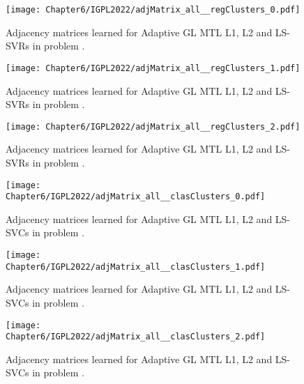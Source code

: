     



\begin{figure}[t!]
    \centering
    \texttt{[image: Chapter6/IGPL2022/adjMatrix\_all\_\_regClusters\_0.pdf]}
    \caption{Adjacency matrices learned for Adaptive GL MTL L1, L2 and LS-SVRs in problem .}
    \label{fig:reg_adjmatrix_regClusters0}
\end{figure}

\begin{figure}[t!]
    \centering
    \texttt{[image: Chapter6/IGPL2022/adjMatrix\_all\_\_regClusters\_1.pdf]}
    \caption{Adjacency matrices learned for Adaptive GL MTL L1, L2 and LS-SVRs in problem .}
    \label{fig:reg_adjmatrix_regClusters1}
\end{figure}

\begin{figure}[t!]
    \centering
    \texttt{[image: Chapter6/IGPL2022/adjMatrix\_all\_\_regClusters\_2.pdf]}
    \caption{Adjacency matrices learned for Adaptive GL MTL L1, L2 and LS-SVRs in problem .}
    \label{fig:reg_adjmatrix_regClusters2}
\end{figure}



\begin{figure}[t!]
    \centering
    \texttt{[image: Chapter6/IGPL2022/adjMatrix\_all\_\_clasClusters\_0.pdf]}
    \caption{Adjacency matrices learned for Adaptive GL MTL L1, L2 and LS-SVCs in problem .}
    \label{fig:clas_adjmatrix_clasClusters0}
\end{figure}

\begin{figure}[t!]
    \centering
    \texttt{[image: Chapter6/IGPL2022/adjMatrix\_all\_\_clasClusters\_1.pdf]}
    \caption{Adjacency matrices learned for Adaptive GL MTL L1, L2 and LS-SVCs in problem .}
    \label{fig:clas_adjmatrix_clasClusters1}
\end{figure}

\begin{figure}[t!]
    \centering
    \texttt{[image: Chapter6/IGPL2022/adjMatrix\_all\_\_clasClusters\_2.pdf]}
    \caption{Adjacency matrices learned for Adaptive GL MTL L1, L2 and LS-SVCs in problem .}
    \label{fig:clas_adjmatrix_clasClusters2}
\end{figure}


